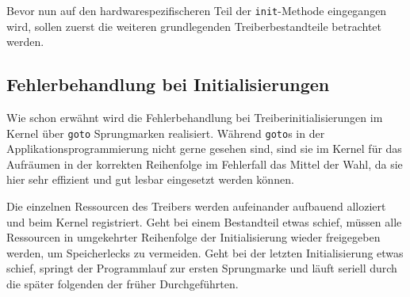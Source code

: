 Bevor nun auf den hardwarespezifischeren Teil der \texttt{init}-Methode eingegangen wird, sollen zuerst die weiteren grundlegenden Treiberbestandteile betrachtet werden. 



\subsection{Fehlerbehandlung bei Initialisierungen}
Wie schon erwähnt wird die Fehlerbehandlung bei Treiberinitialisierungen im Kernel über \texttt{goto} Sprungmarken realisiert. Während \texttt{goto}s in der Applikationsprogrammierung nicht gerne gesehen sind, sind sie im Kernel für das Aufräumen in der korrekten Reihenfolge im Fehlerfall das Mittel der Wahl, da sie hier sehr effizient und gut lesbar eingesetzt werden können. 

Die einzelnen Ressourcen des Treibers werden aufeinander aufbauend alloziert und beim Kernel registriert. Geht bei einem Bestandteil etwas schief, müssen alle Ressourcen in umgekehrter Reihenfolge der Initialisierung wieder freigegeben werden, um Speicherlecks zu vermeiden. Geht bei der letzten Initialisierung etwas schief, springt der Programmlauf zur ersten Sprungmarke und läuft seriell durch die später folgenden der früher Durchgeführten. 

